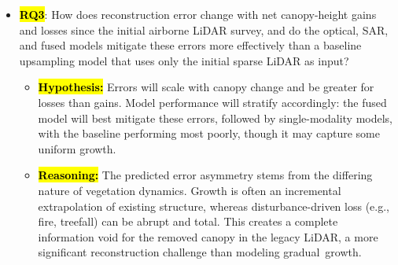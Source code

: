 \documentclass[remotesensing,article,accept,pdftex,moreauthors]{Definitions/mdpi}
\begin{document}
\begin{itemize}
  \item \textbf{\hl{RQ3}}: How does reconstruction error change with net canopy-height gains and losses since the initial airborne LiDAR survey, and do the optical, SAR, and fused models mitigate these errors more effectively than a baseline upsampling model that uses only the initial sparse LiDAR as input?
        \begin{itemize}
            \item \textbf{\hl{Hypothesis:}} Errors will scale with canopy change and be greater for losses than gains. Model performance will stratify accordingly: the fused model will best mitigate these errors, followed by single-modality models, with the baseline performing most poorly, though it may capture some uniform growth.
            \item \textbf{\hl{Reasoning:}} The predicted error asymmetry stems from the differing nature of vegetation dynamics. Growth is often an incremental extrapolation of existing structure, whereas disturbance-driven loss (e.g., fire, treefall) can be abrupt and total. This creates a complete information void for the removed canopy in the legacy LiDAR, a more significant reconstruction challenge than modeling \mbox{gradual growth}.
        \end{itemize}
\end{itemize} 





\section{ %
}

\end{document}
